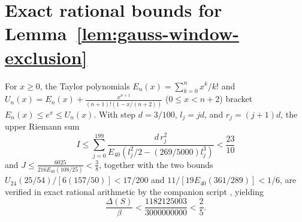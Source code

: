 \documentclass[11pt]{article}
\numberwithin{equation}{section}
\theoremstyle{definition}
\begin{document}



\appendix
\section{Exact rational bounds for Lemma~\ref{lem:gauss-window-exclusion}}\label{app:rational}

For $x\ge0$, the Taylor polynomials $E_n(x)=\sum_{k=0}^n x^k/k!$ and
$U_n(x)=E_n(x)+\frac{x^{n+1}}{(n+1)!(1-x/(n+2))}$ ($0\le x<n+2$) bracket
$E_n(x)\le e^x\le U_n(x)$. With step $d=3/100$, $l_j=jd$, and $r_j=(j+1)d$,
the upper Riemann sum
\begin{equation}\label{eq:finite-sum}
 I\le\sum_{j=0}^{199}
 \frac{d\,r_j^2}{E_{40}(l_j^2/2-(269/5000)l_j^3)}<\frac{23}{10}
\end{equation}
and $J\le\frac{6025}{216E_{40}(108/25)}<\frac38$, together with the two
bounds $U_{24}(25/54)/[6(157/50)]<17/200$ and
$11/[19E_{40}(361/289)]<1/6$, are verified in exact rational arithmetic by the
companion script , yielding
\[
          \frac{\Delta(S)}{\beta}<\frac{1182125003}{3000000000}<\frac25.
\]



\end{document}
